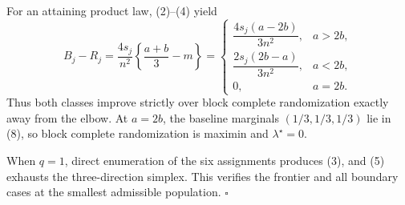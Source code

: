 For an attaining product law, (2)--(4) yield
\[
B_j-R_j
=\frac{4s_j}{n^2}\left\{\frac{a+b}{3}-m\right\}
=
\begin{cases}
\dfrac{4s_j(a-2b)}{3n^2},&a>2b,\\[6pt]
\dfrac{2s_j(2b-a)}{3n^2},&a<2b,\\[6pt]
0,&a=2b.
\end{cases}
\tag{9}
\]
Thus both classes improve strictly over block complete randomization exactly away from the elbow. At \(a=2b\), the baseline marginals \((1/3,1/3,1/3)\) lie in (8), so block complete randomization is maximin and \(\lambda^\star=0\).

When \(q=1\), direct enumeration of the six assignments produces (3), and (5) exhausts the three-direction simplex. This verifies the frontier and all boundary cases at the smallest admissible population. \(\square\)